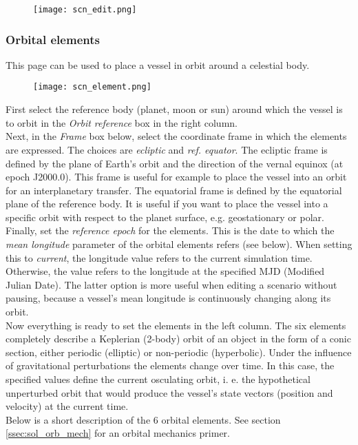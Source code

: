 \documentclass[Orbiter User Manual.tex]{subfiles}
\begin{document}

\begin{figure}[H]
	\centering
	\texttt{[image: scn\_edit.png]}
\end{figure}

\subsubsection{Orbital elements}
This page can be used to place a vessel in orbit around a celestial body.

\begin{figure}[H]
	\centering
	\texttt{[image: scn\_element.png]}
\end{figure}

\noindent
First select the reference body (planet, moon or sun) around which the vessel is to orbit in the \textit{Orbit reference} box in the right column.\\
Next, in the \textit{Frame} box below, select the coordinate frame in which the elements are expressed. The choices are \textit{ecliptic} and \textit{ref. equator}. The ecliptic frame is defined by the plane of Earth's orbit and the direction of the vernal equinox (at epoch J2000.0). This frame is useful for example to place the vessel into an orbit for an interplanetary transfer. The equatorial frame is defined by the equatorial plane of the reference body. It is useful if you want to place the vessel into a specific orbit with respect to the planet surface, e.g. geostationary or polar.\\
Finally, set the \textit{reference epoch} for the elements. This is the date to which the \textit{mean longitude} parameter of the orbital elements refers (see below). When setting this to \textit{current}, the longitude value refers to the current simulation time. Otherwise, the value refers to the longitude at the specified MJD (Modified Julian Date). The latter option is more useful when editing a scenario without pausing, because a vessel's mean longitude is continuously changing along its orbit.\\
Now everything is ready to set the elements in the left column. The six elements completely describe a Keplerian (2-body) orbit of an object in the form of a conic section, either periodic (elliptic) or non-periodic (hyperbolic). Under the influence of gravitational perturbations the  elements change over time. In this case, the specified values define the current osculating orbit, i. e. the hypothetical unperturbed orbit that would produce the vessel's state vectors (position and velocity) at the current time.\\
Below is a short description of the 6 orbital elements. See section \ref{ssec:sol_orb_mech} for an orbital mechanics primer.
\end{document}

